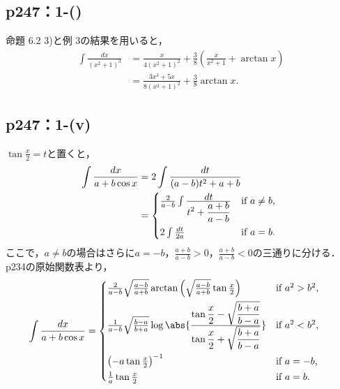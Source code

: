 \documentclass[a4paper,10pt,fleqn]{ltjsarticle}
\begin{document}
\subsection*{p247：1-()}

\begin{leftbar}
    命題 6.2 3)と例 3の結果を用いると，
    \begin{align*}
        \int \frac{dx}{(x^2 + 1)^3}
         & = \frac{x}{4(x^2 + 1)^2} + \frac{3}{8}(\frac{x}{x^2 + 1} + \arctan x) \\
         & = \frac{3x^3 + 5x}{8(x^2+1)^2} + \frac{3}{8} \arctan x.
    \end{align*}
\end{leftbar}

\subsection*{p247：1-(v)}


\begin{tleftbar}
    $\tan \frac{x}{2} = t$と置くと，
    \begin{align*}
        \int \frac{dx}{a+b \cos x}
         & = 2 \int \frac{dt}{(a-b)t^2 + a+b} \\
         & =
        \begin{cases*}
            \frac{2}{a-b} \int \frac{\displaystyle dt}{\displaystyle t^2 + \frac{a+b}{a-b}}
                                 & if $a \neq b$, \\
            2 \int \frac{dt}{2a} & if $a = b$.
        \end{cases*}
    \end{align*}
    ここで，$a \neq b$の場合はさらに$a = -b$，$\frac{a+b}{a-b} > 0$，$\frac{a+b}{a-b} < 0$の三通りに分ける．p234の原始関数表より，
    \begin{align*}
        \int \frac{dx}{a+b \cos x}
         & =
        \begin{cases*}
            \frac{2}{a-b} \sqrt{\frac{a-b}{a+b}}
            \arctan \left({\sqrt{\frac{a-b}{a+b}} \tan \frac{x}{2}}\right) & if $a^2 > b^2$, \\
            \frac{1}{a-b} \sqrt{\frac{b-a}{b+a}}
            \log \abs{\frac{\displaystyle\tan \frac{x}{2}
                    - \sqrt{\frac{b+a}{b-a}}}{\displaystyle\tan \frac{x}{2} + \sqrt{\frac{b+a}{b-a}}}}
                                                                           & if $a^2 < b^2$, \\
            \left(-a \tan \frac{x}{2}\right)^{-1}                          & if $a = -b$,    \\
            \frac{1}{a} \tan {\frac{x}{2}}                                 & if $a = b$.
        \end{cases*}
    \end{align*}
\end{tleftbar}
\end{document}
